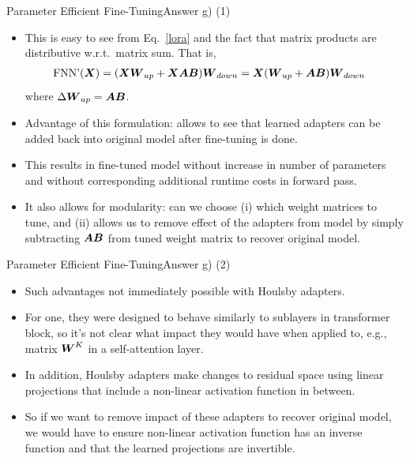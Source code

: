 \documentclass[t]{beamer}
\newcommand\op[1]{\operatorname{#1}}
\begin{document}
\begin{frame}{Parameter Efficient Fine-Tuning}{Answer g) (1)}
    \begin{itemize}
        \item This is easy to see from Eq.~\ref{lora} and the fact
              that matrix products are distributive w.r.t.\ matrix sum.
              That is,
              \begin{align}
                  \op{FNN'}(\mX) & = (\mX\mW_{up} + \mX\mA\mB)\mW_{down} = \mX(\mW_{up} + \mA\mB)\mW_{down}
              \end{align}
              where $\Delta{\boldsymbol{W}}_{up} = {\boldsymbol{A}}{\boldsymbol{B}}$.
        \item Advantage of this formulation: allows to see that
              learned adapters can be added back into original model after
              fine-tuning is done.
        \item This results in fine-tuned model without increase in number of
              parameters and without corresponding additional runtime costs in
              forward pass.
        \item It also allows for modularity: can we choose (i) which weight
              matrices to tune, and (ii) allows us to remove effect
              of the adapters from model by simply subtracting ${\boldsymbol{A}}{\boldsymbol{B}}$ from
              tuned weight matrix to recover original model.
    \end{itemize}
\end{frame}

\begin{frame}{Parameter Efficient Fine-Tuning}{Answer g) (2)}
    \begin{itemize}
        \item Such advantages not immediately possible with Houlsby adapters.
        \item For one, they were designed to behave similarly to sublayers in
              transformer block, so it's not clear what impact they would have
              when applied to, e.g., matrix ${\boldsymbol{W}}^K$ in a self-attention layer.
        \item In addition, Houlsby adapters make changes to residual space using
              linear projections that include a non-linear activation function
              in between.
        \item So if we want to remove impact of these adapters to
              recover original model, we would have to ensure non-linear
              activation function has an inverse function and that the learned
              projections are invertible.
    \end{itemize}
\end{frame}
\end{document}
